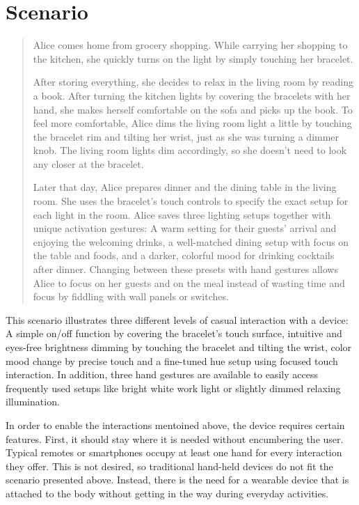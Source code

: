 \chapter{Scenario} %

\begin{quotation}
Alice comes home from grocery shopping. While carrying her shopping to the kitchen, she quickly turns on the light by simply touching her bracelet.

After storing everything, she decides to relax in the living room by reading a book. After turning the kitchen lights by covering the bracelets with her hand, she makes herself comfortable on the sofa and picks up the book. To feel more comfortable, Alice dims the living room light a little by touching the bracelet rim and tilting her wrist, just as she was turning a dimmer knob. The living room lights dim accordingly, so she doesn't need to look any closer at the bracelet.

Later that day, Alice prepares dinner and the dining table in the living room. She uses the bracelet's touch controls to specify the exact setup for each light in the room. Alice saves three lighting setups together with unique activation gestures: A warm setting for their guests' arrival and enjoying the welcoming drinks, a well-matched dining setup with focus on the table and foods, and a darker, colorful mood for drinking cocktails after dinner. Changing between these presets with hand gestures allows Alice to focus on her guests and on the meal instead of wasting time and focus by fiddling with wall panels or switches.
\end{quotation}

This scenario illustrates three different levels of casual interaction with a device: A simple on/off function by covering the bracelet's touch surface, intuitive and eyes-free brightness dimming by touching the bracelet and tilting the wrist, color mood change by precise touch and a fine-tuned hue setup using focused touch interaction. In addition, three hand gestures are available to easily access frequently used setups like bright white work light or slightly dimmed relaxing illumination.

In order to enable the interactions mentoined above, the device requires certain features. First, it should stay where it is needed without encumbering the user. Typical remotes or smartphones occupy at least one hand for every interaction they offer. This is not desired, so traditional hand-held devices do not fit the scenario presented above. Instead, there is the need for a wearable device that is attached to the body without getting in the way during everyday activities.

